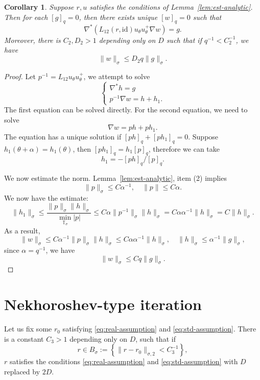 \documentclass[12pt,reqno]{amsart}
\newtheorem{cor}[thm]{Corollary}
\theoremstyle{remark}
\begin{document}
\begin{cor}\label{cor:inverse-bound}
Suppose $r, u$ satisfies the conditions of Lemma~\ref{lem:est-analytic}. Then for each $[g]_q = 0$, then there exists unique $[w]_q = 0$ such that 
\[
	\nabla^*\left( L_{12}(r, {\mathrm{id}}) u_\theta u_\theta^+ \nabla w \right) = g. 
\]
Moreover,  there is $C_2, D_2 >1 $ depending only on $D$ such that if $q^{-1} < C_2^{-1}$, we have 
\[
	\|w\|_\sigma \le D_2 q \|g\|_\sigma. 
\]
\end{cor}
\begin{proof}
	Let $p^{-1} = L_{12} u_\theta u_\theta^+$, we attempt to solve 
	\[
		\begin{cases}
			\nabla^* h = g \\
			p^{-1}\nabla w = h + h_1. 
		\end{cases}
	\]
	The first equation can be solved directly. For the second equation, we need to solve 
	\[
		\nabla w = ph + p h_1. 
	\]
	The equation has a unique solution if  $[ph]_q + [ph_1]_q = 0$. Suppose $h_1(\theta + \alpha) = h_1(\theta)$, then $[ph_1]_q = h_1 [p]_q$, 	therefore we can take
	\[
		h_1 = -  [ph]_q / [p]_q . 
	\]

	We now estimate the norm. 	Lemma~\ref{lem:est-analytic}, item (2) implies
	\[
		\|p\|_\sigma \le C \alpha^{-1}, \quad \|p\| \le C \alpha. 
	\]
	We now have the estimate: 
	\[
		\|h_1\|_{\sigma} \le \frac{\|p\|_{\sigma} \|h\|_{\sigma}}{ \min_{{\mathbb{T}}_{\sigma}} |p|} \le C \alpha \|p^{-1}\|_{\sigma}  \|h\|_{\sigma}  = C \alpha \alpha^{-1} \|h\|_\sigma = C \|h\|_\sigma .
	\]
	 As a result, 
	\[
		\|w\|_\sigma \le C \alpha^{-1} \|p\|_\sigma \|h\|_\sigma \le C \alpha \alpha^{-1} \|h\|_\sigma, \quad 
		\|h\|_\sigma \le \alpha^{-1} \|g\|_\sigma,
	\]
	since $\alpha = q^{-1}$, we have
	\[
		\|w\|_\sigma \le C q \|g\|_\sigma. 
	\]
\end{proof}

\section{Nekhoroshev-type iteration}
\label{sec:nek}

Let us fix some $r_0$ satisfying \eqref{eq:real-assumption} and \eqref{eq:std-assumption}. There is a constant $C_3> 1$ depending only on $D$, such that if 
\begin{equation}
  \label{eq:B-sigma}
  	r \in B_\sigma := \left\{  \|r - r_0\|_{\sigma, 2} < C_3^{-1}  \right\}, 
\end{equation}
$r$ satisfies the conditions \eqref{eq:real-assumption} and \eqref{eq:std-assumption} with $D$ replaced by $2D$. 
\end{document}
